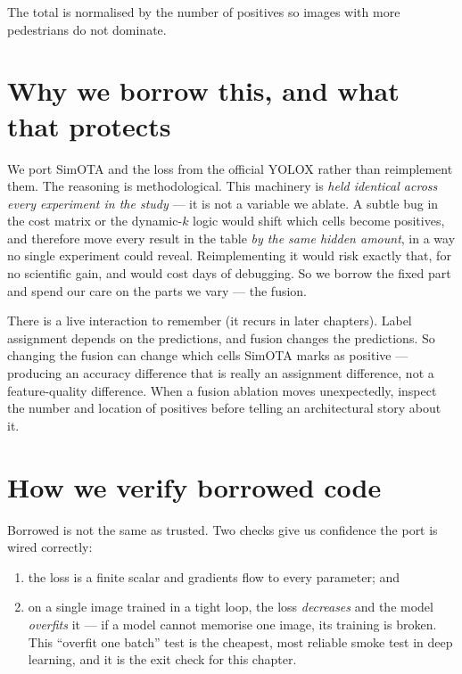 \documentclass[../main.tex]{subfiles}
\begin{document}
The total is normalised by the number of positives so images with more pedestrians do not dominate.

\section{Why we borrow this, and what that protects}

We port SimOTA and the loss from the official YOLOX rather than reimplement them. The reasoning is
methodological. This machinery is \emph{held identical across every experiment in the study} --- it
is not a variable we ablate. A subtle bug in the cost matrix or the dynamic-$k$ logic would shift
which cells become positives, and therefore move every result in the table \emph{by the same
hidden amount}, in a way no single experiment could reveal. Reimplementing it would risk exactly
that, for no scientific gain, and would cost days of debugging. So we borrow the fixed part and
spend our care on the parts we vary --- the fusion.

\begin{lesson}
There is a live interaction to remember (it recurs in later chapters). Label assignment depends on
the predictions, and fusion changes the predictions. So changing the fusion can change which cells
SimOTA marks as positive --- producing an accuracy difference that is really an assignment
difference, not a feature-quality difference. When a fusion ablation moves unexpectedly, inspect
the number and location of positives before telling an architectural story about it.
\end{lesson}

\section{How we verify borrowed code}

Borrowed is not the same as trusted. Two checks give us confidence the port is wired correctly:
\begin{enumerate}
  \item the loss is a finite scalar and gradients flow to every parameter; and
  \item on a single image trained in a tight loop, the loss \emph{decreases} and the model
        \emph{overfits} it --- if a model cannot memorise one image, its training is broken. This
        ``overfit one batch'' test is the cheapest, most reliable smoke test in deep learning, and
        it is the exit check for this chapter.
\end{enumerate}
\end{document}
